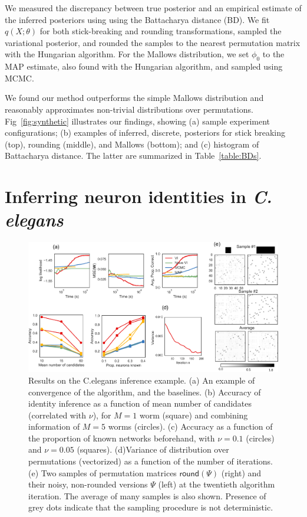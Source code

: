 \documentclass[twoside]{article}
\begin{document}
We measured the discrepancy between true posterior and an empirical
estimate of the inferred posteriors using using the Battacharya
distance (BD). We fit $q(X; \theta)$ for both stick-breaking and
rounding transformations, sampled the variational posterior, and
rounded the samples to the nearest permutation matrix with the
Hungarian algorithm. For the Mallows distribution, we set $\phi_0$ to
the MAP estimate, also found with the Hungarian algorithm, and sampled
using MCMC.
 
We found our method outperforms the simple Mallows distribution and
reasonably approximates non-trivial distributions over
permutations. Fig~\ref{fig:synthetic} illustrates our findings,
showing (a) sample experiment configurations; (b) examples of
inferred, discrete, posteriors for stick breaking (top), rounding
(middle), and Mallows (bottom); and (c) histogram of Battacharya distance.
The latter are summarized in Table~\ref{table:BDs}.


\section{Inferring neuron identities in \textit{C. elegans}}
\label{sec:celegans}

\begin{figure}[ht]
  \centering
  \includegraphics[width=6in]{../figures/figure7.pdf} 
  \caption{Results on the C.elegans inference example. (a) An example of convergence of the algorithm, and the baselines. (b) Accuracy of identity inference as a function of mean number of candidates (correlated with $\nu$), for $M=1$ worm (square) and combining information of $M=5$ worms (circles). (c) Accuracy as a function of the proportion of known networks beforehand,  with $\nu=0.1$ (circles) and $\nu=0.05$ (squares). (d)Variance of distribution over permutations (vectorized) as a function of the number of iterations. (e) Two samples of permutation matrices $\mathsf{round}(\Psi)$ (right) and their noisy, non-rounded versions $\Psi$ (left) at the twentieth algorithm iteration. The average of many samples is also shown. Presence of grey dots indicate that the sampling procedure is not deterministic.}
\label{fig:elegantresults}
\end{figure}
\end{document}
